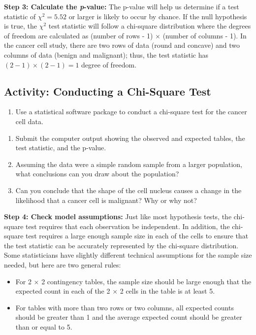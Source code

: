 \documentclass[
]{book}
\providecommand{\tightlist}{%
  \setlength{\itemsep}{0pt}\setlength{\parskip}{0pt}}
\begin{document}
\textbf{Step 3: Calculate the \emph{p}-value:}
The p-value will help us determine if a test statistic of \(\chi^2 = 5.52\) or larger is likely to occur by chance. If the null hypothesis is true, the \(\chi^2\) test statistic will follow a chi-square distribution where the degrees of freedom are calculated as (number of rows - 1) \(\times\) (number of columns - 1). In the cancer cell study, there are two rows of data (round and concave) and two columns of data (benign and malignant); thus, the test statistic has \((2- 1) \times (2- 1) = 1\) degree of freedom.

\hypertarget{activity-conducting-a-chi-square-test}{%
\subsection*{Activity: Conducting a Chi-Square Test}\label{activity-conducting-a-chi-square-test}}

\begin{enumerate}
\def\labelenumi{\arabic{enumi}.}
\setcounter{enumi}{18}
\tightlist
\item
  Use a statistical software package to conduct a chi-square test for the cancer cell data.
\end{enumerate}

\begin{enumerate}
\def\labelenumi{\alph{enumi}.}
\item
  Submit the computer output showing the observed and expected tables, the test statistic, and the
  p-value.
\item
  Assuming the data were a simple random sample from a larger population, what conclusions can
  you draw about the population?
\item
  Can you conclude that the shape of the cell nucleus causes a change in the likelihood that a cancer
  cell is malignant? Why or why not?
\end{enumerate}

\textbf{Step 4: Check model assumptions:}
Just like most hypothesis tests, the chi-square test requires that each observation be independent. In addition, the chi-square test requires a large enough sample size in each of the cells to ensure that the test statistic can be accurately represented by the chi-square distribution. Some statisticians have slightly different technical assumptions for the sample size needed, but here are two general rules:

\begin{itemize}
\tightlist
\item
  For 2 × 2 contingency tables, the sample size should be large enough that the expected count in each of the 2 × 2 cells in the table is at least 5.\\
\item
  For tables with more than two rows or two columns, all expected counts should be greater than 1 and the average expected count should be greater than or equal to 5.
\end{itemize}
\end{document}
